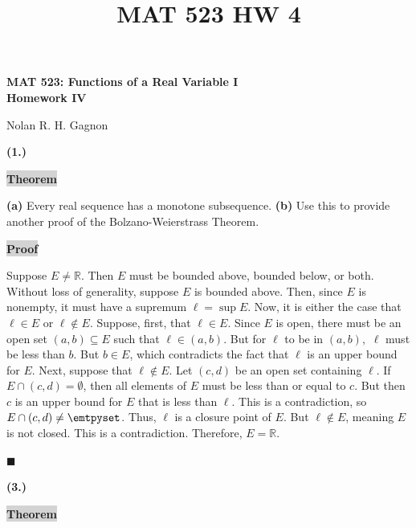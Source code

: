 \documentclass[12pt]{article}
\title{MAT 523 HW 4}
\newcommand{\mybox}{%
    \collectbox{%
        \setlength{\fboxsep}{2pt}%
        \fbox{\BOXCONTENT}%
    }%
}
\begin{document}
\begin{center}
\begin{large}
\textbf{MAT 523: Functions of a Real Variable I \\
Homework IV \\}
\end{large}
Nolan R. H. Gagnon \\
\end{center}

\noindent \textbf{(1.)}

\vspace{3mm}

\noindent\mybox{\colorbox{lightgray}{\textbf{Theorem}}}\hspace{3mm}\hrulefill

\noindent \textbf{(a)} Every real sequence has a monotone subsequence. \textbf{(b)} Use this to provide another proof of the Bolzano-Weierstrass Theorem. 

\vspace{5mm}

\noindent\mybox{\colorbox{lightgray}{\textbf{Proof}}}\hspace{3mm}\hrulefill

\noindent Suppose $E\neq\mathbb{R}$. Then $E$ must be bounded above, bounded below, or both. Without loss of generality, suppose $E$ is bounded above. Then, since $E$ is nonempty, it must have a supremum $\ell = \sup E$. Now, it is either the case that $\ell\in E$ or $\ell\not\in E$.  Suppose, first, that $\ell\in E$. Since $E$ is open, there must be an open set $(a,b)\subseteq E$ such that $\ell\in(a,b).$ But for $\ell$ to be in $(a,b),$ $\ell$ must be less than $b$. But $b\in E$, which contradicts the fact that $\ell$ is an upper bound for $E$.  Next, suppose that $\ell\not\in E$. Let $(c,d)$ be an open set containing $\ell$. If $E\cap(c,d)=\emptyset$, then all elements of $E$ must be less than or equal to $c$. But then $c$ is an upper bound for $E$ that is less than $\ell$. This is a contradiction, so $E\cap(c,d)\neq\emtpyset$. Thus, $\ell$ is a closure point of $E$. But $\ell\not\in E$, meaning $E$ is not closed. This is a contradiction.  Therefore, $E = \mathbb{R}.$

\hfill$\blacksquare$

\pagebreak

\noindent \textbf{(3.)} 

\vspace{3mm}

\noindent\mybox{\colorbox{lightgray}{\textbf{Theorem}}}\hspace{3mm}\hrulefill 
\end{document}

